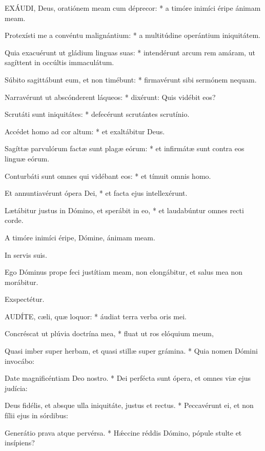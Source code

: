 
\lettrine[lines=2]{E}{XÁUDI}, Deus, oratiónem meam cum déprecor: * a timóre inimíci éripe ánimam meam.

Protexísti me a convéntu malignántium: * a multitúdine operántium iniquitátem.

Quia exacuérunt ut gládium linguas suas: * intendérunt arcum rem amáram, ut sagíttent in occúltis immaculátum.

Súbito sagittábunt eum, et non timébunt: * firmavérunt sibi sermónem nequam.

Narravérunt ut abscónderent láqueos: * dixérunt: Quis vidébit eos?

Scrutáti sunt iniquitátes: * defecérunt scrutántes scrutínio.

Accédet homo ad cor altum: * et exaltábitur Deus.

Sagíttæ parvulórum factæ sunt plagæ eórum: * et infirmátæ sunt contra eos linguæ eórum.

Conturbáti sunt omnes qui vidébant eos: * et tímuit omnis homo.

Et annuntiavérunt ópera Dei, * et facta ejus intellexérunt.

Lætábitur justus in Dómino, et sperábit in eo, * et laudabúntur omnes recti corde.

 A timóre inimíci éripe, Dómine, ánimam meam.

 In servis suis.


 Ego Dóminus prope feci justítiam meam, non elongábitur, et salus mea non morábitur.

 Exspectétur.


\lettrine[lines=2]{A}{UDÍTE}, cæli, quæ loquor: * áudiat terra verba oris mei.

Concréscat ut plúvia doctrína mea, * fluat ut ros elóquium meum,

Quasi imber super herbam, et quasi stillæ super grámina. * Quia nomen Dómini invocábo:

Date magnificéntiam Deo nostro. * Dei perfécta sunt ópera, et omnes viæ ejus judícia:

Deus fidélis, et absque ulla iniquitáte, justus et rectus. * Peccavérunt ei, et non fílii ejus in sórdibus:

Generátio prava atque pervérsa. * Hǽccine réddis Dómino, pópule stulte et insípiens?

